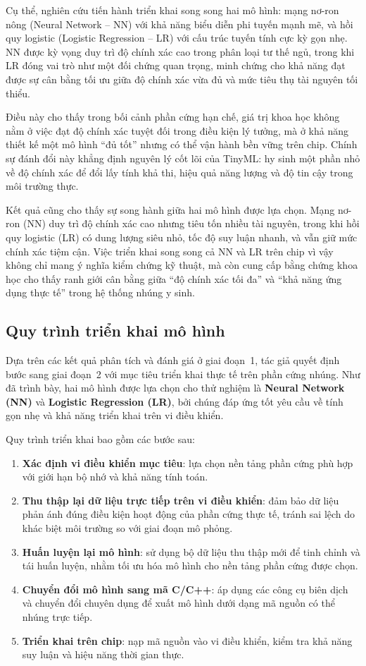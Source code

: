 Cụ thể, nghiên cứu tiến hành triển khai song song hai mô hình: mạng nơ-ron nông (Neural Network – NN) với khả năng biểu diễn phi tuyến mạnh mẽ, và hồi quy logistic (Logistic Regression – LR) với cấu trúc tuyến tính cực kỳ gọn nhẹ. NN được kỳ vọng duy trì độ chính xác cao trong phân loại tư thế ngủ, trong khi LR đóng vai trò như một đối chứng quan trọng, minh chứng cho khả năng đạt được sự cân bằng tối ưu giữa độ chính xác vừa đủ và mức tiêu thụ tài nguyên tối thiểu.  

Điều này cho thấy trong bối cảnh phần cứng hạn chế, giá trị khoa học không nằm ở việc đạt độ chính xác tuyệt đối trong điều kiện lý tưởng, mà ở khả năng thiết kế một mô hình “đủ tốt” nhưng có thể vận hành bền vững trên chip. Chính sự đánh đổi này khẳng định nguyên lý cốt lõi của TinyML: hy sinh một phần nhỏ về độ chính xác để đổi lấy tính khả thi, hiệu quả năng lượng và độ tin cậy trong môi trường thực.  

Kết quả cũng cho thấy sự song hành giữa hai mô hình được lựa chọn. Mạng nơ-ron (NN) duy trì độ chính xác cao nhưng tiêu tốn nhiều tài nguyên, trong khi hồi quy logistic (LR) có dung lượng siêu nhỏ, tốc độ suy luận nhanh, và vẫn giữ mức chính xác tiệm cận. Việc triển khai song song cả NN và LR trên chip vì vậy không chỉ mang ý nghĩa kiểm chứng kỹ thuật, mà còn cung cấp bằng chứng khoa học cho thấy ranh giới cân bằng giữa “độ chính xác tối đa” và “khả năng ứng dụng thực tế” trong hệ thống nhúng y sinh.


\subsection{Quy trình triển khai mô hình}


Dựa trên các kết quả phân tích và đánh giá ở giai đoạn~1, 
tác giả quyết định bước sang giai đoạn~2 với mục tiêu triển khai thực tế trên phần cứng nhúng. 
Như đã trình bày, hai mô hình được lựa chọn cho thử nghiệm là \textbf{Neural Network (NN)} 
và \textbf{Logistic Regression (LR)}, bởi chúng đáp ứng tốt yêu cầu về tính gọn nhẹ và khả năng triển khai trên vi điều khiển.  

Quy trình triển khai bao gồm các bước sau:  
\begin{enumerate}
    \item \textbf{Xác định vi điều khiển mục tiêu}: lựa chọn nền tảng phần cứng phù hợp với giới hạn bộ nhớ và khả năng tính toán.  
    \item \textbf{Thu thập lại dữ liệu trực tiếp trên vi điều khiển}: đảm bảo dữ liệu phản ánh đúng điều kiện hoạt động của phần cứng thực tế, tránh sai lệch do khác biệt môi trường so với giai đoạn mô phỏng.  
    \item \textbf{Huấn luyện lại mô hình}: sử dụng bộ dữ liệu thu thập mới để tinh chỉnh và tái huấn luyện, nhằm tối ưu hóa mô hình cho nền tảng phần cứng được chọn.  
    \item \textbf{Chuyển đổi mô hình sang mã C/C++}: áp dụng các công cụ biên dịch và chuyển đổi chuyên dụng để xuất mô hình dưới dạng mã nguồn có thể nhúng trực tiếp.  
    \item \textbf{Triển khai trên chip}: nạp mã nguồn vào vi điều khiển, kiểm tra khả năng suy luận và hiệu năng thời gian thực.  
\end{enumerate}
